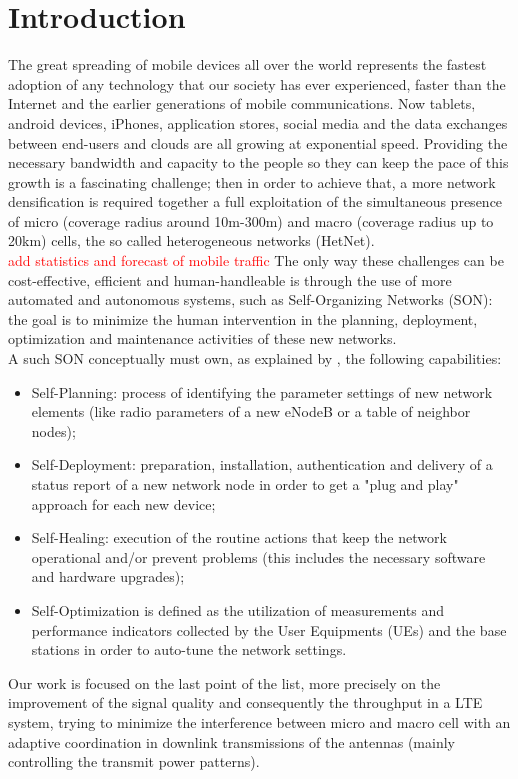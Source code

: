 \documentclass[conference,10pt]{IEEEtran}
\begin{document}
\section{Introduction}\label{sec:intro}
The great spreading of mobile devices all over the world represents the fastest adoption of any technology that
our society has ever experienced, faster than the Internet and the earlier generations of mobile
communications. Now tablets, android devices, iPhones, application stores, social media and the data
exchanges between end-users and clouds are all growing at exponential speed. Providing the necessary bandwidth and capacity to the people so they can keep the pace of this growth is a fascinating challenge; then in order to achieve that, a more network densification is required together a full exploitation of the simultaneous presence of micro (coverage radius around 10m-300m) and macro (coverage radius up to 20km) cells, the so called heterogeneous networks (HetNet).\\
\textcolor{red}{add statistics and forecast of mobile traffic}
The only way these challenges can be cost-effective, efficient and human-handleable is through the use of more automated and autonomous systems, such as Self-Organizing Networks (SON): the goal is to minimize the human intervention in the planning, deployment, optimization and maintenance activities of these new networks.\\
A such SON conceptually must own, as explained by \cite{ramiro2011self}, the following capabilities:
\begin{itemize}
\item Self-Planning: process of identifying the parameter settings of new network elements (like radio parameters of a new eNodeB or a table of neighbor nodes);
\item Self-Deployment: preparation, installation, authentication and delivery of a status report of
a new network node in order to get a "plug and play" approach for each new device;
\item Self-Healing: execution of the routine actions that keep the network operational and/or
prevent problems (this includes the necessary software and hardware upgrades);
\item Self-Optimization is defined as the utilization of measurements and performance indicators
collected by the User Equipments (UEs) and the base stations in order to auto-tune the network
settings.
\end{itemize}
Our work is focused on the last point of the list, more precisely on the improvement of the signal quality and consequently the throughput in a LTE system, trying to minimize the interference between micro and macro cell with an adaptive coordination in downlink transmissions of the antennas (mainly controlling the transmit power patterns).\\
\end{document}
